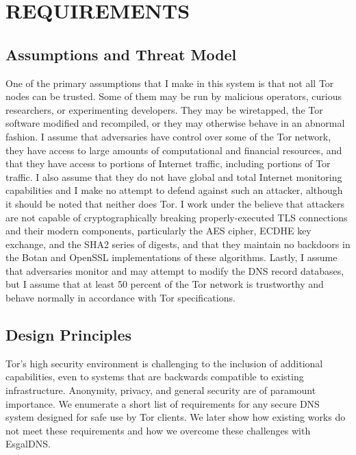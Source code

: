 
\chapter{\uppercase{Requirements}}

\section{Assumptions and Threat Model}

One of the primary assumptions that I make in this system is that not all Tor nodes can be trusted. Some of them may be run by malicious operators, curious researchers, or experimenting developers. They may be wiretapped, the Tor software modified and recompiled, or they may otherwise behave in an abnormal fashion. I assume that adversaries have control over some of the Tor network, they have access to large amounts of computational and financial resources, and that they have access to portions of Internet traffic, including portions of Tor traffic. I also assume that they do not have global and total Internet monitoring capabilities and I make no attempt to defend against such an attacker, although it should be noted that neither does Tor. I work under the believe that attackers are not capable of cryptographically breaking properly-executed TLS connections and their modern components, particularly the AES cipher, ECDHE key exchange, and the SHA2 series of digests, and that they maintain no backdoors in the Botan and OpenSSL implementations of these algorithms. Lastly, I assume that adversaries monitor and may attempt to modify the DNS record databases, but I assume that at least 50 percent of the Tor network is trustworthy and behave normally in accordance with Tor specifications.

\section{Design Principles}

Tor's high security environment is challenging to the inclusion of additional capabilities, even to systems that are backwards compatible to existing infrastructure. Anonymity, privacy, and general security are of paramount importance. We enumerate a short list of requirements for any secure DNS system designed for safe use by Tor clients. We later show how existing works do not meet these requirements and how we overcome these challenges with EsgalDNS.


